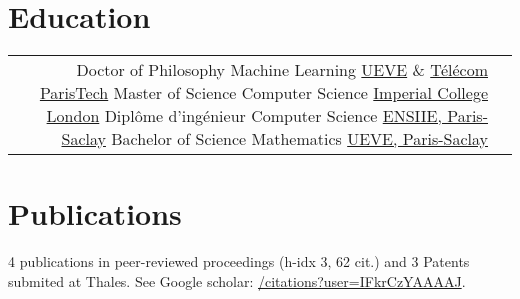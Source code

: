 \documentclass[10pt]{article} %
\begin{document}
\begin{paracol}{2}
\section{Education}
%
%
%
%
%
\begin{supertabular}{rl} %
%
%
    {Doctor of Philosophy} %
    {} %
    {Machine Learning} %
    {\href{https://www.ibisc.univ-evry.fr/}{UEVE} \&
     \href{https://ltci.telecom-paristech.fr/}{T\'el\'ecom ParisTech}}
%
%
    {Master of Science} %
    {} %
    {Computer Science} %
    {\href{http://www.imperial.ac.uk/computing}{Imperial College London}} %
%
%
    {Dipl\^ome d'ing\'enieur} %
    {} %
    {Computer Science} %
    {\href{http://www.ensiie.fr/}{ENSIIE, Paris-Saclay}}
%
%
    {Bachelor of Science} %
    {} %
    {Mathematics} %
    {\href{https://www.univ-evry.fr/accueil.html}{UEVE, Paris-Saclay}}
%
%
\end{supertabular}
%
%
\section{Publications}
4 publications in peer-reviewed proceedings (h-idx 3, 62 cit.) and 3 Patents
submited at Thales. See Google scholar:
\href{https://scholar.google.fr/citations?user=IFkrCzYAAAAJ}{/citations?user=IFkrCzYAAAAJ}.
\medskip
%
%

\end{paracol}
\end{document}
